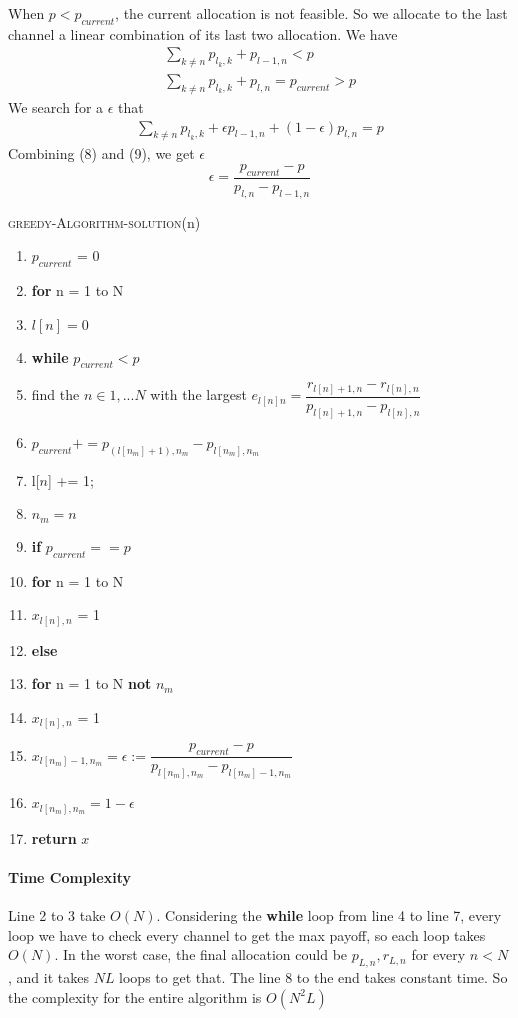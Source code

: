 \documentclass[11pt, oneside]{report}
\begin{document}
When $p < p_{current}$, the current allocation is not feasible. So we allocate to the last channel a linear combination of its last two allocation. We have 
\begin{align}
\sum_{k \ne n} p_{l_k,k} + p_{l-1,n} < p \\
\sum_{k \ne n} p_{l_k,k} + p_{l,n} = p_{current} > p
\end{align}
We search for a $\epsilon$ that 
\begin{align}
\sum_{k \ne n} p_{l_k,k} + \epsilon p_{l-1,n} + (1-\epsilon) p_{l,n} = p
\end{align}
Combining (8) and (9), we get $\epsilon$
$$ \epsilon = \dfrac{p_{current} - p}{p_{l,n} - p_{l-1,n}}$$

\noindent\textsc{greedy-Algorithm-solution}(n)
\begin{enumerate}[1\ ]
\setlength{\topsep}{0.05ex}
\setlength{\itemsep}{0.05ex}
\item $p_{current}$ = 0 
\item \textbf{for} n = 1 to N
\item \qquad $l[n] = 0$
\item \textbf{while} $p_{current} < p$  
\item \qquad  find the $n \in {1,...N}$ with the largest $e_{l[n]n} = \dfrac{r_{l[n]+1,n} - r_{l[n],n}}{p_{l[n]+1,n} - p_{l[n],n}}$ 
\item \qquad  $p_{current} += p_{(l[n_{m}] + 1), n_{m}} - p_{l[n_{m}], n_{m}}$
\item \qquad  l[$n$] += 1;
\item \qquad $n_m = n$
\item \textbf{if} $p_{current} == p$
\item \qquad \textbf{for} n = 1 to N
\item \qquad \qquad $x_{l[n],n}$ = 1
\item \textbf{else} 
\item \qquad \textbf{for} n = 1 to N \textbf{not} $n_m$
\item \qquad \qquad $x_{l[n],n}$ = 1
\item \qquad $x_{l[n_m] - 1,n_m} = \epsilon := \dfrac{p_{current} - p}{p_{l[n_m],n_m} - p_{l[n_m]-1,n_m}}$
\item \qquad $x_{l[n_m],n_m} = 1 - \epsilon$
\item \textbf{return} $x$
\end{enumerate}

\paragraph{Time Complexity} Line 2 to 3 take $O(N)$. Considering the \textbf{while} loop from line 4 to line 7, every loop we have to check every channel to get the max payoff, so each loop takes $O(N)$. In the worst case, the final allocation could be $p_{L,n}, r_{L,n}$ for every $n < N$, and it takes $NL$ loops to get that. The line 8 to the end  takes constant time. So the complexity for the entire algorithm is $O(N^2L)$  
\end{document}
